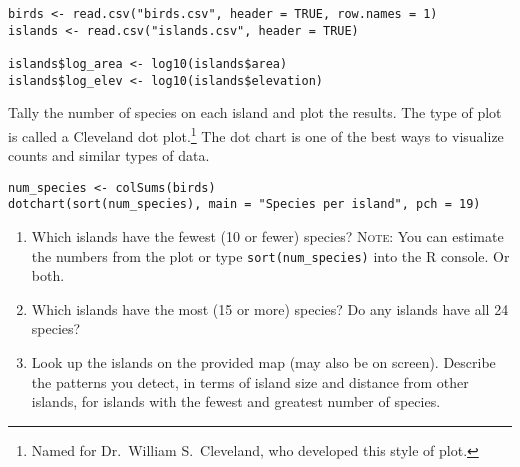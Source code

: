 \documentclass[11pt]{article}
\newcommand{\bigSpace}{\vspace{4\baselineskip}}
\begin{document}
{%
\begin{verbatim}
birds <- read.csv("birds.csv", header = TRUE, row.names = 1)
islands <- read.csv("islands.csv", header = TRUE)

islands$log_area <- log10(islands$area)
islands$log_elev <- log10(islands$elevation)
\end{verbatim}
}

\medskip


\vspace{\baselineskip}


Tally the number of species on each island and plot the results. The  type of plot is called a Cleveland dot plot.\footnote{Named for Dr.~William S.~Cleveland, who developed this style of plot.} The dot chart is one of the best ways to visualize counts and similar types of data.

{%
\begin{verbatim}
num_species <- colSums(birds) 
dotchart(sort(num_species), main = "Species per island", pch = 19)
\end{verbatim}
}

\begin{enumerate}[resume]
\item Which islands have the fewest (10 or fewer) species? \textsc{Note:} You can estimate the numbers from the plot or type \texttt{sort(num\_species)} into the R console. Or both.

\bigSpace\newpage

\item Which islands have the most (15 or more) species? Do any islands have all 24 species?

\bigSpace

\item Look up the islands on the provided map (may also be on screen). Describe the patterns you detect, in terms of island size and distance from other islands, for islands with the fewest and greatest number of species.


\bigSpace

\end{enumerate}
\end{document}
